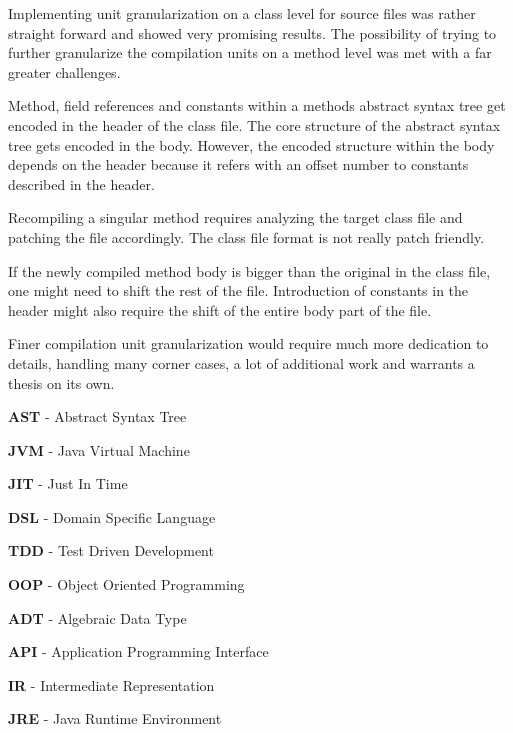 \documentclass{VUMIFPSbakalaurinis}
\begin{document}

Implementing unit granularization on a class level for source files was rather straight forward and showed very promising results.
The possibility of trying to further granularize the compilation units on a method level was met with a far greater challenges.

Method, field references and constants within a methods abstract syntax tree get encoded in the header of the class file.
The core structure of the abstract syntax tree gets encoded in the body.
However, the encoded structure within the body depends on the header because it refers with an offset number to constants described in the header.

Recompiling a singular method requires analyzing the target class file and patching the file accordingly.
The class file format is not really patch friendly.

If the newly compiled method body is bigger than the original in the class file, one might need to shift the rest of the file.
Introduction of constants in the header might also require the shift of the entire body part of the file.

Finer compilation unit granularization would require much more dedication to details, handling many corner cases, a lot of additional work and warrants a thesis on its own.



\textbf{AST} - Abstract Syntax Tree

\textbf{JVM} - Java Virtual Machine

\textbf{JIT} - Just In Time

\textbf{DSL} - Domain Specific Language

\textbf{TDD} - Test Driven Development

\textbf{OOP} - Object Oriented Programming

\textbf{ADT} - Algebraic Data Type

\textbf{API} - Application Programming Interface

\textbf{IR} - Intermediate Representation

\textbf{JRE} - Java Runtime Environment

\appendix  %

\printbibliography[heading=bibintoc]
\end{document}
